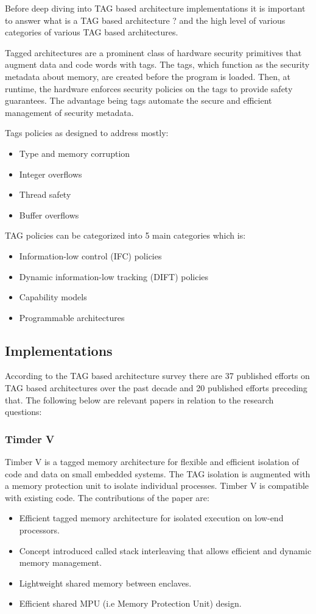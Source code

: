 Before deep diving into TAG based architecture implementations it is important to 
answer what is a TAG based architecture ? and the high level of various 
categories of various TAG based architectures.

Tagged architectures are a prominent class of hardware security primitives that augment data and code words
with tags. The tags, which function as the security metadata
about memory, are created before the program is loaded. 
Then, at runtime, the hardware enforces security policies on the tags to provide safety guarantees. 
The advantage being tags automate the secure and efficient management of security metadata. 

Tags policies as designed to address mostly:
\begin{itemize}
  \item Type and memory corruption
  \item Integer overflows
  \item Thread safety
  \item Buffer overflows
\end{itemize}

TAG policies can be categorized into 5 main categories which is:
\begin{itemize}
  \item Information-low control (IFC) policies
  \item Dynamic information-low tracking (DIFT) policies
  \item Capability models
  \item Programmable architectures
\end{itemize}

\subsection{Implementations}
 
According to the TAG based architecture survey \cite{acmTAGSurvey} there are 37 published
efforts on TAG based architectures over the past decade and 20 published efforts preceding that. 
The following below are relevant papers in relation to the research questions: 

\subsubsection{Timder V}
 Timber V\cite{weiser_timber-v_2019} is a tagged memory architecture for flexible and efficient isolation of code and data on 
 small embedded systems. The TAG isolation is augmented with a memory protection unit to isolate 
 individual processes. Timber V is compatible with existing code. The contributions of the paper 
 are: 
 \begin{itemize}
  \item Efficient tagged memory architecture for isolated execution on low-end processors. 
  \item Concept introduced called stack interleaving that allows efficient and dynamic memory management. 
  \item Lightweight shared memory between enclaves. 
  \item Efficient shared MPU (i.e Memory Protection Unit) design. 
 \end{itemize}

